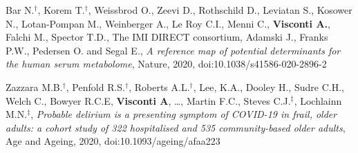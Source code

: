 \documentclass[a4paper,10pt]{article}
\begin{document}
{\begin{itemize}
		 Bar N.$^{\textbf{$\dag $}}$, Korem T.$^{\textbf{$\dag $}}$, Weissbrod O., Zeevi D., Rothschild D., Leviatan S., Kosower N., Lotan-Pompan M., Weinberger A., Le Roy C.I., Menni C., \textbf{Visconti A.}, Falchi M., Spector T.D., The IMI DIRECT consortium, Adamski J., Franks P.W., Pedersen O. and Segal E., \emph{A reference map of potential determinants for the human serum metabolome}, Nature, 2020, doi:10.1038/s41586-020-2896-2

		 Zazzara M.B.$^{\textbf{$\dag $}}$, Penfold R.S.$^{\textbf{$\dag $}}$, Roberts A.L.$^{\textbf{$\dag $}}$, Lee, K.A., Dooley H., Sudre C.H., Welch C., Bowyer R.C.E, \textbf{Visconti A}, \dots, Martin F.C., Steves C.J.$^{\textbf{$\ddag $}}$, Lochlainn M.N.$^{\textbf{$\ddag $}}$, \emph{Probable delirium is a presenting symptom of COVID-19 in frail, older adults: a cohort study of 322 hospitalised and 535 community-based older adults}, Age and Ageing, 2020, doi:10.1093/ageing/afaa223
		
	\end{itemize}
}
\end{document}
